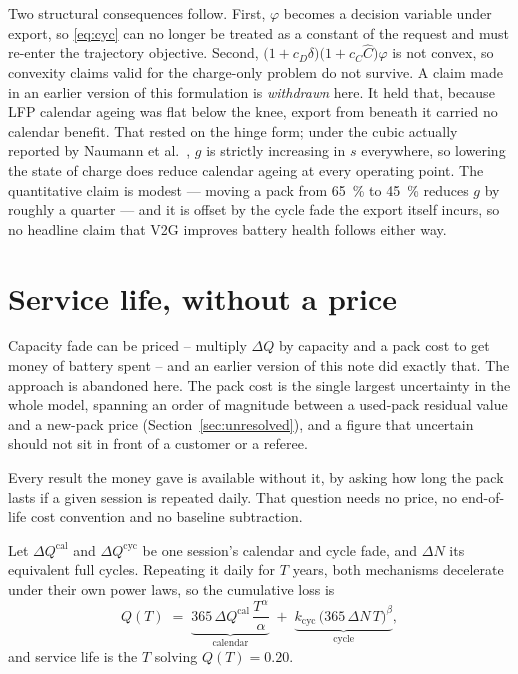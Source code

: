 \documentclass[11pt,a4paper]{article}
\newcommand{\dQ}{\Delta Q}
\begin{document}
Two structural consequences follow. First, $\varphi$ becomes a decision
variable under export, so \eqref{eq:cyc} can no longer be treated as a
constant of the request and must re-enter the trajectory objective.
Second, $\bigl(1 + c_D\delta\bigr)\bigl(1 + c_C\hat{C}\bigr)\varphi$ is
not convex, so convexity claims valid for the charge-only problem do not
survive. A claim made in an earlier version of this formulation is
\emph{withdrawn} here. It held that, because LFP calendar ageing was
flat below the knee, export from beneath it carried no calendar
benefit. That rested on the hinge form; under the cubic actually
reported by Naumann et al.\ \cite{naumann2018}, $g$ is strictly
increasing in $s$ everywhere, so lowering the state of charge does
reduce calendar ageing at every operating point. The quantitative
claim is modest --- moving a pack from \SI{65}{\percent} to
\SI{45}{\percent} reduces $g$ by roughly a quarter --- and it is
offset by the cycle fade the export itself incurs, so no headline
claim that V2G improves battery health follows either way.

\section{Service life, without a price}
\label{sec:servicelife}

Capacity fade can be priced -- multiply $\dQ$ by capacity and a pack
cost to get money of battery spent -- and an earlier version of this
note did exactly that. The approach is abandoned here. The pack cost
is the single largest uncertainty in the whole model, spanning an
order of magnitude between a used-pack residual value and a new-pack
price (Section~\ref{sec:unresolved}), and a figure that uncertain
should not sit in front of a customer or a referee.

Every result the money gave is available without it, by asking how
long the pack lasts if a given session is repeated daily. That
question needs no price, no end-of-life cost convention and no
baseline subtraction.

Let $\dQ^{\mathrm{cal}}$ and $\dQ^{\mathrm{cyc}}$ be one session's
calendar and cycle fade, and $\Delta N$ its equivalent full cycles.
Repeating it daily for $T$ years, both mechanisms decelerate under
their own power laws, so the cumulative loss is
%
\begin{equation}
Q(T) \;=\;
  \underbrace{365\,\dQ^{\mathrm{cal}}\,\frac{T^{\alpha}}{\alpha}}_{\text{calendar}}
  \;+\;
  \underbrace{k_{\mathrm{cyc}}\,\bigl(365\,\Delta N\,T\bigr)^{\beta}}_{\text{cycle}},
\label{eq:servicelife}
\end{equation}
%
and service life is the $T$ solving $Q(T) = 0.20$.
\end{document}
